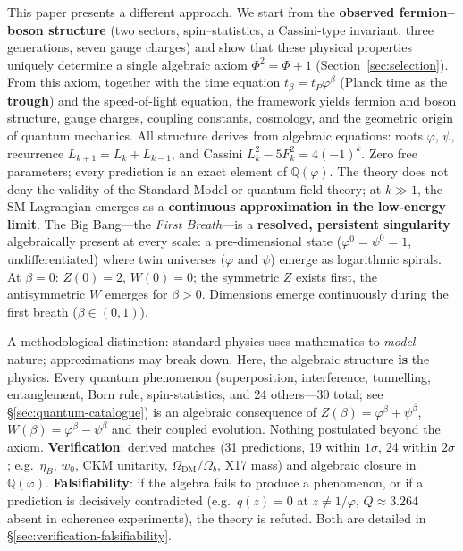 \documentclass[12pt,a4paper]{article}
\begin{document}
This paper presents a different approach. We start from the \textbf{observed fermion--boson structure} (two sectors, spin--statistics, a Cassini-type invariant, three generations, seven gauge charges) and show that these physical properties uniquely determine a single algebraic axiom $\Phi^2 = \Phi + 1$ (Section~\ref{sec:selection}). From this axiom, together with the time equation $t_\beta = t_P\varphi^\beta$ (Planck time as the \textbf{trough}) and the speed-of-light equation, the framework yields fermion and boson structure, gauge charges, coupling constants, cosmology, and the geometric origin of quantum mechanics. All structure derives from algebraic equations: roots $\varphi$, $\psi$, recurrence $L_{k+1} = L_k + L_{k-1}$, and Cassini $L_k^2 - 5F_k^2 = 4(-1)^k$. Zero free parameters; every prediction is an exact element of $\mathbb{Q}(\varphi)$. The theory does not deny the validity of the Standard Model or quantum field theory; at $k \gg 1$, the SM Lagrangian emerges as a \textbf{continuous approximation in the low-energy limit}. The Big Bang---the \emph{First Breath}---is a \textbf{resolved, persistent singularity} algebraically present at every scale: a pre-dimensional state ($\varphi^0 = \psi^0 = 1$, undifferentiated) where twin universes ($\varphi$ and $\psi$) emerge as logarithmic spirals. At $\beta = 0$: $Z(0) = 2$, $W(0) = 0$; the symmetric $Z$ exists first, the antisymmetric $W$ emerges for $\beta > 0$. Dimensions emerge continuously during the first breath ($\beta \in (0,1)$).

A methodological distinction: standard physics uses mathematics to \emph{model} nature; approximations may break down. Here, the algebraic structure \textbf{is} the physics. Every quantum phenomenon (superposition, interference, tunnelling, entanglement, Born rule, spin-statistics, and 24 others---30 total; see \S\ref{sec:quantum-catalogue}) is an algebraic consequence of $Z(\beta) = \varphi^\beta + \psi^\beta$, $W(\beta) = \varphi^\beta - \psi^\beta$ and their coupled evolution. Nothing postulated beyond the axiom. \textbf{Verification}: derived matches (31 predictions, 19 within $1\sigma$, 24 within $2\sigma$; e.g.\ $\eta_B$, $w_0$, CKM unitarity, $\Omega_{\mathrm{DM}}/\Omega_b$, X17 mass) and algebraic closure in $\mathbb{Q}(\varphi)$. \textbf{Falsifiability}: if the algebra fails to produce a phenomenon, or if a prediction is decisively contradicted (e.g.\ $q(z){=}0$ at $z \neq 1/\varphi$, $Q \approx 3.264$ absent in coherence experiments), the theory is refuted. Both are detailed in \S\ref{sec:verification-falsifiability}.
\end{document}
